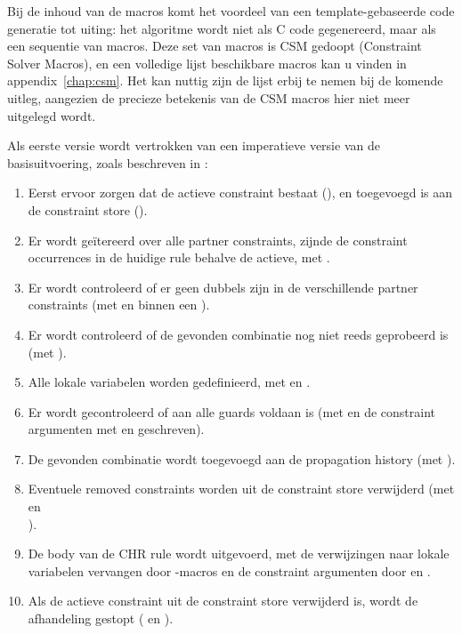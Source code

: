 Bij de inhoud van de macros komt het voordeel van een template-gebaseerde code generatie tot uiting: het algoritme wordt niet als C code gegenereerd, maar als een sequentie van macros. Deze set van macros is CSM gedoopt (Constraint Solver Macros), en een volledige lijst beschikbare macros kan u vinden in appendix~\ref{chap:csm}. Het kan nuttig zijn de lijst erbij te nemen bij de komende uitleg, aangezien de precieze betekenis van de CSM macros hier niet meer uitgelegd wordt.

Als eerste versie wordt vertrokken van een imperatieve versie van de basisuitvoering, zoals beschreven in \cite{tomsphdthesis}:
\begin{enumerate}
  \item Eerst ervoor zorgen dat de actieve constraint bestaat (), en toegevoegd is aan de constraint store ().
  \item Er wordt ge\"itereerd over alle partner constraints, zijnde de constraint occurrences in de huidige rule behalve de actieve, met .
  \item Er wordt controleerd of er geen dubbels zijn in de verschillende partner constraints (met  en  binnen een ).
  \item Er wordt controleerd of de gevonden combinatie nog niet reeds geprobeerd is (met ).
  \item Alle lokale variabelen worden gedefinieerd, met  en .
  \item Er wordt gecontroleerd of aan alle guards voldaan is (met  en de constraint argumenten met  en  geschreven).
  \item De gevonden combinatie wordt toegevoegd aan de propagation history (met ).
  \item Eventuele removed constraints worden uit de constraint store verwijderd (met  en \\ ).
  \item De body van de CHR rule wordt uitgevoerd, met de verwijzingen naar lokale variabelen vervangen door -macros en de constraint argumenten door  en .
  \item Als de actieve constraint uit de constraint store verwijderd is, wordt de afhandeling gestopt ( en ).
\end{enumerate}

